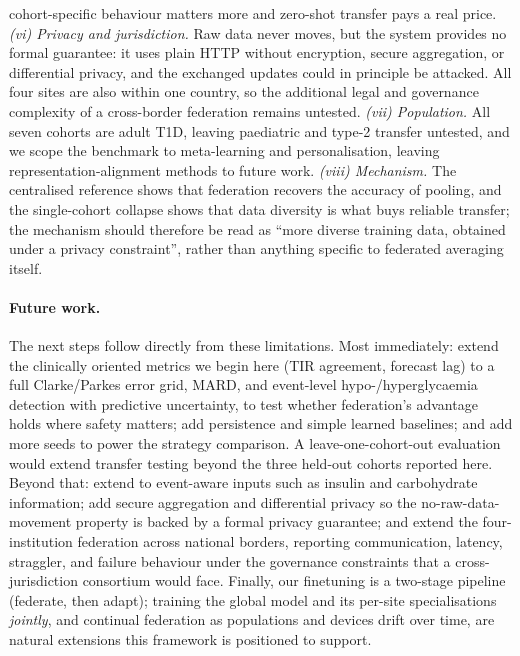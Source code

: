 \documentclass[10pt,letterpaper]{article}
\begin{document}
cohort-specific behaviour matters more and zero-shot transfer pays a real price. \emph{(vi) Privacy and jurisdiction.} Raw data never moves, but the system
provides no formal guarantee: it uses plain HTTP without encryption, secure
aggregation, or differential privacy, and the exchanged updates could in principle
be attacked. All four sites are also within one country, so the additional legal
and governance complexity of a cross-border federation remains untested. \emph{(vii) Population.} All seven cohorts
are adult T1D, leaving paediatric and type-2 transfer untested, and we scope the
benchmark to meta-learning and personalisation, leaving representation-alignment
methods to future work. \emph{(viii) Mechanism.} The centralised reference shows
that federation recovers the accuracy of pooling, and the single-cohort collapse
shows that data diversity is what buys reliable transfer; the mechanism should
therefore be read as ``more diverse training data, obtained under a privacy
constraint'', rather than anything specific to federated averaging itself.

\paragraph{Future work.} The next steps follow directly from these limitations.
Most immediately: extend the clinically oriented metrics we begin here (TIR
agreement, forecast lag) to a full Clarke/Parkes error grid, MARD, and event-level
hypo-/hyperglycaemia detection with predictive uncertainty, to test whether
federation's advantage holds where safety matters; add persistence and simple
learned baselines; and add more seeds to power the
strategy comparison. A leave-one-cohort-out evaluation would extend transfer
testing beyond the three held-out cohorts reported here. Beyond that: extend to
event-aware inputs such as insulin and carbohydrate information; add secure
aggregation and differential privacy so the no-raw-data-movement property is
backed by a formal privacy guarantee; and extend the four-institution federation
across national borders, reporting communication, latency, straggler, and failure
behaviour under the governance constraints that a cross-jurisdiction consortium
would face. Finally, our finetuning is a two-stage pipeline (federate, then adapt);
training the global model and its per-site specialisations \emph{jointly}, and
continual federation as populations and devices drift over time, are natural
extensions this framework is positioned to support.



\end{document}
